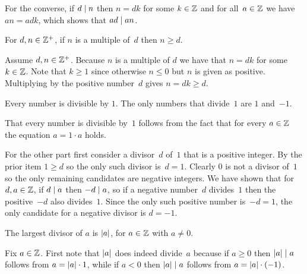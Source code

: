 \documentclass{ibl}  %
\begin{document}
\begin{problem}
\begin{exes}
\begin{answer}
  For the converse, 
  if $d\mid n$ then $n=dk$ for some $k\in\mathbb{Z}$ and for all~$a\in\mathbb{Z}$
  we have $an=adk$, which shows that $ad\mid an$.
\end{answer}
\begin{exercise}  \label{exer:ComparisonDivisibility}
  For $d,n\in\mathbb{Z}^+$, if $n$ is a multiple of~$d$ then $n\geq d$.
\end{exercise}
\begin{answer}
  Assume $d,n\in\mathbb{Z}^+$.
  Because $n$ is a multiple of $d$ we have that $n=dk$ for some $k\in\mathbb{Z}$.
  Note that $k\geq 1$ since otherwise $n\leq 0$ but $n$ is given as positive.  
  Multiplying by the positive number~$d$ gives $n=dk\geq d$.
\end{answer}
\begin{exercise}
  Every number is divisible by $1$.
  The only numbers that divide~$1$ are $1$ and~$-1$.
\end{exercise}
\begin{answer}
  That every number is divisible by~$1$ follows from the fact that
   for every $a\in\mathbb{Z}$ the equation $a=1\cdot a$ holds.

  For the other part 
  first consider a divisor~$d$ of~$1$ that is a positive integer.
  By the prior item $1\geq d$ so the only such divisor is~$d=1$.
  Clearly $0$ is not a divisor of~$1$ so the only remaining candidates
  are negative integers.
  We have shown that for $d,a\in\mathbb{Z}$, if $d\mid a$ then $-d\mid a$,
  so if a negative number~$d$ divides~$1$ then the positive~$-d$ 
  also divides~$1$.
  Since the only such positive number is~$-d=1$, the only 
  candidate for a negative divisor is $d=-1$. 
\end{answer}
\begin{exercise}
  The largest divisor of $a$ is $\lvert a\rvert$, for $a\in\mathbb{Z}$ with $a\neq 0$.
\end{exercise}
\begin{answer}
  Fix $a\in\mathbb{Z}$. 
  First note that $\lvert a\rvert$ does indeed divide~$a$ because
  if $a\geq 0$ then $\lvert a\rvert\mid a$ follows from 
  $a=\lvert a\rvert\cdot 1$,
  while if $a<0$ then $\lvert a\rvert\mid a$ follows from 
  $a=\lvert a\rvert\cdot(-1)$.


\end{answer}
\end{exes}
\end{problem}
\end{document}
